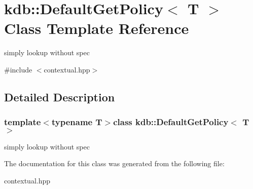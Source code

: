 \hypertarget{classkdb_1_1DefaultGetPolicy}{\section{kdb\-:\-:Default\-Get\-Policy$<$ T $>$ Class Template Reference}
\label{classkdb_1_1DefaultGetPolicy}
}


simply lookup without spec  




{\ttfamily \#include $<$contextual.\-hpp$>$}



\subsection{Detailed Description}
\subsubsection*{template$<$typename T$>$class kdb\-::\-Default\-Get\-Policy$<$ T $>$}

simply lookup without spec 

The documentation for this class was generated from the following file\-:\begin{DoxyCompactItemize}
\item 
contextual.\-hpp\end{DoxyCompactItemize}
